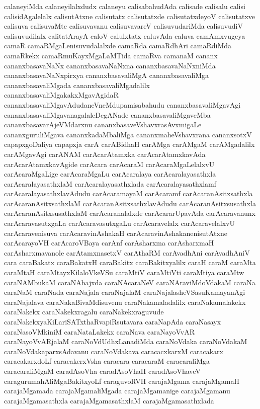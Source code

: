 {calaneyiMda
calaneyilalxdudx
calaneyu
calisabahudAda
calisade
calisalu
calisi
calisidAgalelalx
calisutAtxne
calisutatx
calisutatxde
calisutatxdeyoV
calisutatxve
calisuva
calisuvaMte
calisuvavanu
calisuvavareV
calisuvudariMda
calisuvudiV
calisuvudilalx
calitatArayA
caloV
calulxtatx
caluvAda
caluva
camAmxvugeya
camaR
camaRMgaLenisuvudalalxde
camaRda
camaRdhAri
camaRdiMda
camaRkekx
camaRmuKayxMgaLaMTida
camaRva
camanaM
cananx
cananxbasavaNaNx
cananxbasavaNaNxna
cananxbasavaNaNxniMda
cananxbasavaNaNxpirxya
cananxbasavaliMgA
cananxbasavaliMga
cananxbasavaliMgada
cananxbasavaliMgadalilx
cananxbasavaliMgakakxMgavAgidaR
cananxbasavaliMgavAdudaneVneMdupamisabahudu
cananxbasavaliMgavAgi
cananxbasavaliMgavanagalaleDegANade
cananxbasavaliMgaveMba
cananxbasavarAjeVMdarxnu
cananxbasaveVshavxrasAvxmigaLe
cananxguruliMgava
cananxkadaMbaliMga
cananxmaheVshavxrana
cananxsotxV
capapxgoDaliya
capapxja
carA
carABidhaH
carAMga
carAMgaM
carAMgadalilx
carAMgavAgi
carANAM
carAcarAtamxka
carAcarAtamxkavAda
carAcarAtamxkavAgide
carAcara
carAcaraM
carAcaraMgaLelalxvU
carAcaraMgaLige
carAcaraMgaLu
carAcaralaya
carAcaralayasathxla
carAcaralayasathxlaM
carAcaralayasathxlada
carAcaralayasathxlamf
carAcaralayasathxlavAdudu
carAcaramayaM
carAcaramf
carAcaranAsitxsathxla
carAcaranAsitxsathxlaM
carAcaranAsitxsathxlavAdudu
carAcaranAsitxsusathxla
carAcaranAsitxsusathxlaM
carAcaranalalxde
carAcararUpavAda
carAcaravanunx
carAcaravasutxgaLa
carAcaravasutxgaLu
carAcaravelalx
carAcaravelalxvU
carAcaravenisuva
carAcaravinAshakaH
carAcaravinAshakanenisutAtxne
carAcarayoVH
carAcaroVBaya
carAnf
carAsharxma
carAsharxmaH
carAsharxmavanole
carAtamxnasetxV
carAthaRM
carAvadhAni
carAvadhAniV
cara
caraBakatx
caraBakatxH
caraBakitx
caraBakitxyalilx
caraH
caraM
caraMta
caraMtaH
caraMtayxKilaloVkeVSu
caraMtiV
caraMtiVti
caraMtiya
caraMtw
caraNAMbukaM
caraNAbajxda
caraNAcaraNeV
caraNAraviMdoVdakaM
caraNa
caraNaM
caraNada
caraNajala
caraNajalaM
caraNajalasheVSasuKamayanAgi
caraNajalava
caraNakaBivaMdisuvenu
caraNakamaladalilx
caraNakamalakekx
caraNakekx
caraNakekxragalu
caraNakekxraguvude
caraNakekxyaKiLariSATxthaRvapiRsutavara
caraNapAda
caraNasayx
caraNasoVMkiniM
caraNataLakekx
caraNava
caraNayoVvAR
caraNayoVvARjalaM
caraNoVdUdhxLanadiMda
caraNoVdaka
caraNoVdakaM
caraNoVdakaparxsAdavanu
caraNoVdakava
caracacxkarxM
caracakarx
caracakarxdoLf
caracakerxVsha
caracara
caracaraM
caracaraliMga
caracaraliMgaM
caradAsoVha
caradAsoVhaH
caradAsoVhaveV
caragurumahAliMgaBakitxyoLf
caraguvoRVH
carajaMgama
carajaMgamaH
carajaMgamada
carajaMgamaliMgada
carajaMgamanige
carajaMgamanu
carajaMgamasathxla
carajaMgamasathxlaM
carajaMgamasathxlada
}
